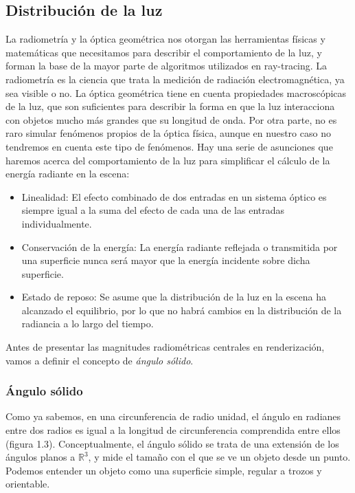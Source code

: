 \subsection{Distribución de la luz}

La radiometría y la óptica geométrica nos otorgan las herramientas físicas y matemáticas que necesitamos para describir el comportamiento de la luz, y forman la base de la mayor parte de algoritmos utilizados en ray-tracing. La radiometría es la ciencia que trata la medición de radiación electromagnética, ya sea visible o no. La óptica geométrica tiene en cuenta propiedades macroscópicas de la luz, que son suficientes para describir la forma en que la luz interacciona con objetos mucho más grandes que su longitud de onda. Por otra parte, no es raro simular fenómenos propios de la óptica física, aunque en nuestro caso no tendremos en cuenta este tipo de fenómenos. Hay una serie de asunciones que haremos acerca del comportamiento de la luz para simplificar el cálculo de la energía radiante en la escena:

\begin{itemize}
\item Linealidad: El efecto combinado de dos entradas en un sistema óptico es siempre igual a la suma del efecto de cada una de las entradas individualmente.
\item Conservación de la energía: La energía radiante reflejada o transmitida por una superficie nunca será mayor que la energía incidente sobre dicha superficie.
  \item Estado de reposo: Se asume que la distribución de la luz en la escena ha alcanzado el equilibrio, por lo que no habrá cambios en la distribución de la radiancia a lo largo del tiempo.
\end{itemize}

Antes de presentar las magnitudes radiométricas centrales en renderización, vamos a definir el concepto de \emph{ángulo sólido}.

\subsubsection*{Ángulo sólido}

Como ya sabemos, en una circunferencia de radio unidad, el ángulo en radianes entre dos radios es igual a la longitud de circunferencia comprendida entre ellos (figura 1.3). Conceptualmente, el ángulo sólido se trata de una extensión de los ángulos planos a $\mathds{R}^3$, y mide el tamaño con el que se ve un objeto desde un punto. Podemos entender un objeto como una superficie simple, regular a trozos y orientable.

